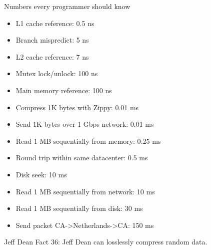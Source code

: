 \documentclass{beamer}
\begin{document}
\begin{frame}{Numbers every programmer should know}
  \begin{itemize}
    \item L1 cache reference: 0.5 ns
    \item Branch mispredict: 5 ns
    \item L2 cache reference: 7 ns
    \item Mutex lock/unlock: 100 ns
    \item Main memory reference: 100 ns
    \item Compress 1K bytes with Zippy: 0.01 ms
    \item Send 1K bytes over 1 Gbps network: 0.01 ms
    \item Read 1 MB sequentially from memory: 0.25 ms
    \item Round trip within same datacenter: 0.5 ms
    \item Disk seek: 10 ms
    \item Read 1 MB sequentially from network: 10 ms
    \item Read 1 MB sequentially from disk: 30 ms
    \item Send packet CA->Netherlands->CA: 150 ms
  \end{itemize}
  Jeff Dean {\scriptsize Fact 36: Jeff Dean can losslessly compress random data.}
\end{frame}
\end{document}

